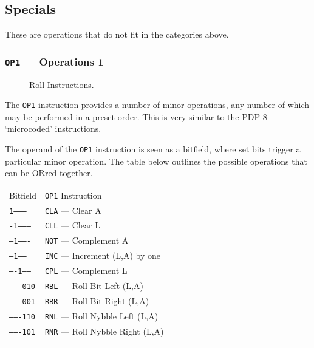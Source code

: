 \documentclass[11pt,a4paper,twocolumns]{article}
\newcommand\register[1]{\textsf{#1}}
\newcommand\A{\register{A}}
\newcommand\Lreg{\register{L}}
\begin{document}
\subsection{Specials}

These are operations that do not fit in the categories above.

\subsubsection{{\tt OP1} — Operations 1}
\label{sec-op1}

\begin{figure}[tb]
  \centering
  
  \caption{\label{fig-roll}Roll Instructions.}
\end{figure}

The {\tt OP1} instruction provides a number of minor operations, any
number of which may be performed in a preset order. This is very
similar to the PDP-8 ‘microcoded’ instructions.

The operand of the {\tt OP1} instruction is seen as a bitfield, where
set bits trigger a particular minor operation. The table below
outlines the possible operations that can be ORred together.

\vspace{1em}\noindent\begin{center}
\begin{tabular}{ll}
  Bitfield & {\tt OP1} Instruction \\\noalign{\smallskip}\hline\noalign{\smallskip}
  {\tt 1---------} & {\tt CLA} — Clear \A \\
  {\tt -1--------} & {\tt CLL} — Clear \Lreg \\
  {\tt --1-------} & {\tt NOT} — Complement \A \\
  {\tt ---1------} & {\tt INC} — Increment (\Lreg,\A) by one \\
  {\tt ----1-----} & {\tt CPL} — Complement \Lreg \\
  {\tt -------010} & {\tt RBL} — Roll Bit Left (\Lreg,\A) \\
  {\tt -------001} & {\tt RBR} — Roll Bit Right (\Lreg,\A) \\
  {\tt -------110} & {\tt RNL} — Roll Nybble Left (\Lreg,\A) \\
  {\tt -------101} & {\tt RNR} — Roll Nybble Right (\Lreg,\A) \\\noalign{\smallskip}\hline\noalign{\smallskip}
\end{tabular}
\end{center}\vspace{1em}
\end{document}
